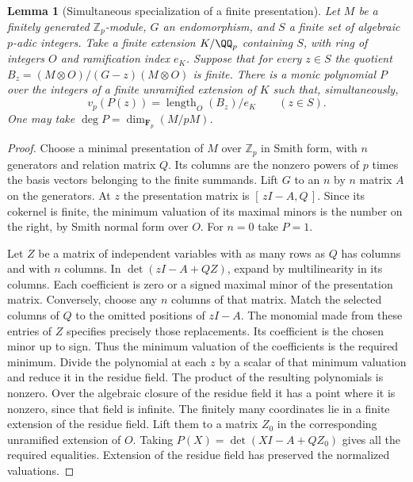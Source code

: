 \documentclass[a4paper,11pt]{article}
\newtheorem{lemma}[proposition]{Lemma}
\theoremstyle{definition}
\theoremstyle{remark}
\newcommand{\ZZ}{\mathbb Z}\newcommand{\ord}{\operatorname{ord}}
\numberwithin{equation}{section}
\begin{document}
\begin{lemma}[Simultaneous specialization of a finite presentation]\leavevmode\label{lem:simuldet340}
Let $M$ be a finitely generated $\ZZ_p$-module, $G$ an endomorphism,
and $S$ a finite set of algebraic $p$-adic integers. Take a finite
extension $K/\QQ_p$ containing $S$, with ring of integers $O$ and
ramification index $e_K$. Suppose that for every $z\in S$ the quotient
$B_z=(M\otimes O)/(G-z)(M\otimes O)$ is finite. There is a monic
polynomial $P$ over the integers of a finite unramified extension of
$K$ such that, simultaneously,
\[
                 v_p(P(z))=\operatorname{length}_{O}(B_z)/e_K
                     \qquad(z\in S).
\]
One may take $\deg P=\dim_{\mathbf F_p}(M/pM)$.
\end{lemma}
\begin{proof}
Choose a minimal presentation of $M$ over $\ZZ_p$ in Smith form, with
$n$ generators and relation matrix $Q$. Its columns are the nonzero
powers of $p$ times the basis vectors belonging to the finite summands.
Lift $G$ to an $n$ by $n$ matrix $A$ on the generators. At $z$ the
presentation matrix is $[\,zI-A, Q\,]$. Since its cokernel is finite,
the minimum valuation of its maximal minors is the number on the
right, by Smith normal form over $O$. For $n=0$ take $P=1$.

Let $Z$ be a matrix of independent variables with as many rows as
$Q$ has columns and with $n$ columns. In $\det(zI-A+QZ)$, expand by
multilinearity in its columns. Each coefficient is zero or a signed
maximal minor of the presentation matrix. Conversely, choose any
$n$ columns of that matrix. Match the selected columns of $Q$ to the
omitted positions of $zI-A$. The monomial made from these entries of
$Z$ specifies precisely those replacements. Its coefficient is the
chosen minor up to sign. Thus the minimum valuation of the coefficients
is the required minimum. Divide the polynomial at each $z$ by a scalar
of that minimum valuation and reduce it in the residue field. The
product of the resulting polynomials is nonzero. Over the algebraic
closure of the residue field it has a point where it is nonzero, since
that field is infinite. The finitely many coordinates lie in a finite
extension of the residue field. Lift them to a matrix $Z_0$ in the
corresponding unramified extension of $O$. Taking
$P(X)=\det(XI-A+QZ_0)$ gives all the required equalities. Extension
of the residue field has preserved the normalized valuations.
\end{proof}
\end{document}
